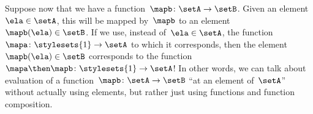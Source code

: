 Suppose now that we have a function~$\mapb \colon \setA \to \setB$.
Given an element~$\ela \in \setA$, this will be mapped by~$\mapb$ to an element~$\mapb(\ela) \in \setB$.
If we use, instead of~$\ela \in \setA$, the function~$\mapa \colon \stylesets{1} \to \setA$ to which it corresponds, then the element~$\mapb(\ela) \in \setB$ corresponds to the function~$\mapa \then \mapb\colon \stylesets{1} \to \setA$!
In other words, we can talk about evaluation of a function~$\mapb \colon \setA \to \setB$ ``at an element of~$\setA$'' without actually using elements, but rather just using functions and function composition.







